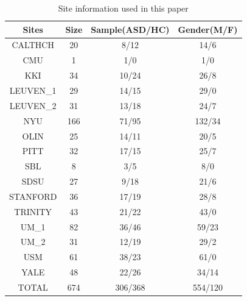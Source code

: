 \documentclass[a4paper]{cas-dc}
\begin{document}
\begin{table}[]
\caption{Site information used in this paper}\label{Table1}
\begin{tabular*}{\tblwidth}{@{}cccc@{}}
\toprule
  \textbf{Sites} & \textbf{Size} & \textbf{Sample(ASD/HC)} & \textbf{Gender(M/F)} \\ %
\midrule
CALTHCH                 & 20                           & 8/12          & 14/6               \\
CMU                     & 1                            & 1/0           & 1/0                    \\
KKI                     & 34                           & 10/24          & 26/8                 \\
LEUVEN\_1               & 29                           & 14/15          & 29/0                \\
LEUVEN\_2               & 31                           & 13/18          & 24/7                \\
NYU                     & 166                          & 71/95          & 132/34              \\
OLIN                    & 25                           & 14/11          & 20/5                \\
PITT                    & 32                           & 17/15          & 25/7                \\
SBL                     & 8                            & 3/5           & 8/0                \\
SDSU                    & 27                           & 9/18          & 21/6                \\
STANFORD                & 36                           & 17/19          & 28/8                \\
TRINITY                 & 43                           & 21/22          & 43/0                \\
UM\_1                   & 82                           & 36/46          & 59/23               \\
UM\_2                   & 31                           & 12/19          & 29/2                 \\
USM                     & 61                           & 38/23          & 61/0                \\
YALE                    & 48                           & 22/26          & 34/14               \\
TOTAL                   & 674                          & 306/368         & 554/120            \\
\bottomrule
\end{tabular*}
\end{table}
\end{document}
